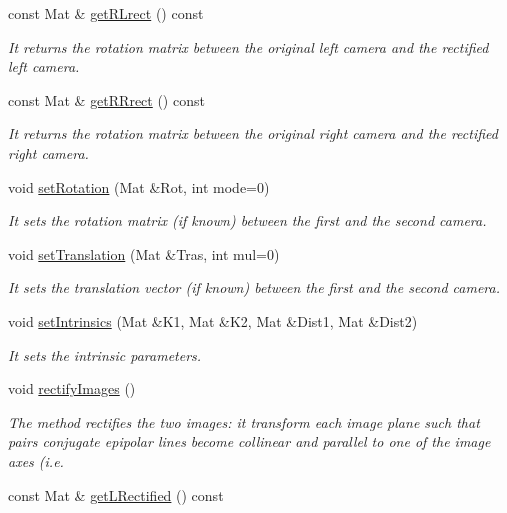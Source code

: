 \begin{DoxyCompactItemize}
const Mat \& \hyperlink{classStereoCamera_a5cf815bf714816c5af5bf95cc34f2253}{get\+R\+Lrect} () const 
\begin{DoxyCompactList}\small\item\em It returns the rotation matrix between the original left camera and the rectified left camera. \end{DoxyCompactList}\item 
const Mat \& \hyperlink{classStereoCamera_a2a22bada00b768bf233247cd1d885fdf}{get\+R\+Rrect} () const 
\begin{DoxyCompactList}\small\item\em It returns the rotation matrix between the original right camera and the rectified right camera. \end{DoxyCompactList}\item 
void \hyperlink{classStereoCamera_a1329b3894d527e1505618f57a1304624}{set\+Rotation} (Mat \&Rot, int mode=0)
\begin{DoxyCompactList}\small\item\em It sets the rotation matrix (if known) between the first and the second camera. \end{DoxyCompactList}\item 
void \hyperlink{classStereoCamera_a7b10f1218e8e70f47b22080ba1820d39}{set\+Translation} (Mat \&Tras, int mul=0)
\begin{DoxyCompactList}\small\item\em It sets the translation vector (if known) between the first and the second camera. \end{DoxyCompactList}\item 
void \hyperlink{classStereoCamera_a54754623497c8dddb61f520e17f465f8}{set\+Intrinsics} (Mat \&K1, Mat \&K2, Mat \&Dist1, Mat \&Dist2)
\begin{DoxyCompactList}\small\item\em It sets the intrinsic parameters. \end{DoxyCompactList}\item 
void \hyperlink{classStereoCamera_ae5ac866c6d4b6c4819b01a918e7b61e0}{rectify\+Images} ()
\begin{DoxyCompactList}\small\item\em The method rectifies the two images\+: it transform each image plane such that pairs conjugate epipolar lines become collinear and parallel to one of the image axes (i.\+e. \end{DoxyCompactList}\item 
const Mat \& \hyperlink{classStereoCamera_a095a64623e073a8349cfec590d9dce04}{get\+L\+Rectified} () const 

\end{DoxyCompactItemize}
